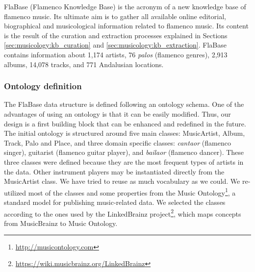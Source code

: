 FlaBase (Flamenco Knowledge Base) is the acronym of a new knowledge base of flamenco music. Its ultimate aim is to gather all available online editorial, biographical and musicological information related to flamenco music. Its content is the result of the curation and extraction processes explained in Sections \ref{sec:musicology:kb_curation} and \ref{sec:musicology:kb_extraction}. %
FlaBase contains information about 1,174 artists, 76 \textit{palos} (flamenco genres), 2,913 albums, 14,078 tracks, and 771 Andalusian locations.


\subsubsection{Ontology definition}
\label{sec:musicology:ontology}

The FlaBase data structure is defined following an ontology schema. One of the advantages of using an ontology is that it can be easily modified. Thus, our design is a first building block that can be enhanced and redefined in the future. The initial ontology is structured around five main classes: MusicArtist, Album, Track, Palo and Place, and three domain specific classes: \textit{cantaor} (flamenco singer), guitarist (flamenco guitar player), and \textit{bailaor} (flamenco dancer). These three classes were defined because they are the most frequent types of artists in the data. Other instrument players may be instantiated directly from the MusicArtist class. 
We have tried to reuse as much vocabulary as we could. We re-utilized most of the classes and some properties from the Music Ontology\footnote{\url{http://musicontology.com}}, a standard model for publishing music-related data. We selected the classes according to the ones used by the LinkedBrainz project\footnote{\url{https://wiki.musicbrainz.org/LinkedBrainz}}, which maps concepts from MusicBrainz to Music Ontology.


